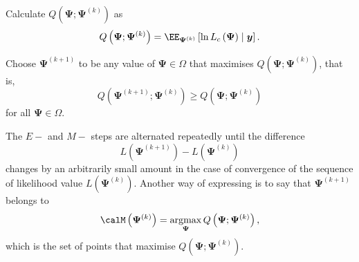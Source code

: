 \begin{defe}[$E-$step] \label{defe: e_step}
    Calculate $Q \left( \bm{\Psi} ; \bm{\Psi}^{(k)} \right)$ as
    \begin{equation*}
        Q \left( \bm{\Psi} ; \bm{\Psi}^{(k)} \right) = \EE_{\bm{\Psi}^{(k)}} \left[ \ln L_c \left( \bm{\Psi} \right) \mid \bm{y} \right].
    \end{equation*}
\end{defe}

\begin{defe}[$M-$step] \label{defe: m_step}
    Choose $\bm{\Psi}^{(k+1)}$ to be any value of $\bm{\Psi} \in \Omega$ that maximises $Q \left( \bm{\Psi} ; \bm{\Psi}^{(k)} \right)$, that is,
    \begin{equation*}
        Q \left( \bm{\Psi}^{(k+1)} ; \bm{\Psi}^{(k)} \right) \geq Q \left( \bm{\Psi} ; \bm{\Psi}^{(k)} \right)
    \end{equation*}
    for all $\bm{\Psi} \in \Omega$.
\end{defe}

The $E-$ and $M-$ steps are alternated repeatedly until the difference
\begin{equation*}
    L (\bm{\Psi}^{(k+1)}) - L (\bm{\Psi}^{(k)})
\end{equation*}
changes by an arbitrarily small amount in the case of convergence of the sequence of likelihood value $L (\bm{\Psi}^{(k)})$. Another way of expressing  is to say that $\bm{\Psi}^{(k+1)}$ belongs to
\begin{equation*}
    \calM \left( \bm{\Psi}^{(k)} \right) = \operatornamewithlimits{argmax}_{\bm{\Psi}} Q \left( \bm{\Psi} ; \bm{\Psi}^{(k)} \right),
\end{equation*}
which is the set of points that maximise $Q \left( \bm{\Psi} ; \bm{\Psi}^{(k)} \right)$.